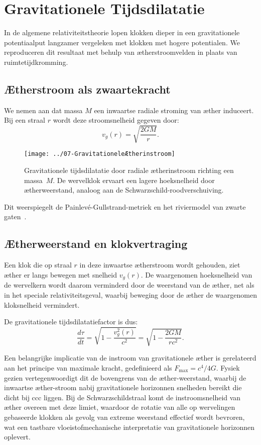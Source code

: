 \section{Gravitationele Tijdsdilatatie}

In de algemene relativiteitstheorie lopen klokken dieper in een gravitationele potentiaalput langzamer vergeleken met klokken met hogere potentialen. We reproduceren dit resultaat met behulp van ætherstroomvelden in plaats van ruimtetijdkromming.

\subsection*{Ætherstroom als zwaartekracht}

We nemen aan dat massa $M$ een inwaartse radiale stroming van æther induceert. Bij een straal $r$ wordt deze stroomsnelheid gegeven door:
\[
    v_g(r) = \sqrt{\frac{2GM}{r}}.
\]

\begin{figure}[htbp]
    \centering
    \texttt{[image: ../07-GravitationeleÆtherinstroom]}
    \caption{Gravitationele tijdsdilatatie door radiale ætherinstroom richting een massa~$M$. De wervelklok ervaart een lagere hoeksnelheid door ætherweerstand, analoog aan de Schwarzschild-roodverschuiving.}
    \label{fig:GravitationeleÆtherinstroom}
\end{figure}

Dit weerspiegelt de Painlevé-Gullstrand-metriek en het riviermodel van zwarte gaten~\cite{Hamilton2004-river}.

\subsection*{Ætherweerstand en klokvertraging}

Een klok die op straal $r$ in deze inwaartse ætherstroom wordt gehouden, ziet æther er langs bewegen met snelheid $v_g(r)$. De waargenomen hoeksnelheid van de wervelkern wordt daarom verminderd door de weerstand van de æther, net als in het speciale relativiteitsgeval, waarbij beweging door de æther de waargenomen kloksnelheid vermindert.

De gravitationele tijdsdilatatiefactor is dus:
\[
    \frac{d\tau}{dt} = \sqrt{1 - \frac{v_g^2(r)}{c^2}} = \sqrt{1 - \frac{2GM}{rc^2}}. \tag{4}
\]

Een belangrijke implicatie van de instroom van gravitationele æther is gerelateerd aan het principe van maximale kracht, gedefinieerd als $F_\text{max} = c^4 /4G$. Fysiek gezien vertegenwoordigt dit de bovengrens van de æther-weerstand, waarbij de inwaartse æther-stroom nabij gravitationele horizonnen snelheden bereikt die dicht bij ccc liggen. Bij de Schwarzschildstraal komt de instroomsnelheid van æther overeen met deze limiet, waardoor de rotatie van alle op wervelingen gebaseerde klokken als gevolg van extreme weerstand effectief wordt bevroren, wat een tastbare vloeistofmechanische interpretatie van gravitationele horizonnen oplevert.

